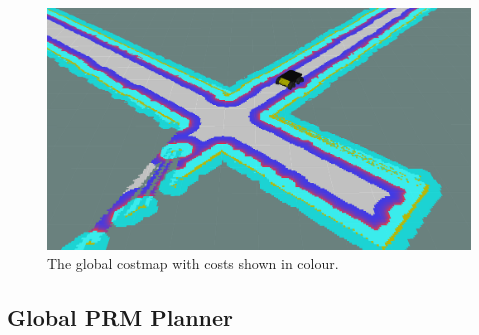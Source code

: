 \documentclass[letterpaper, 10 pt, conference]{ieeeconf}  %
\begin{document}
	\begin{figure}[!ht]
		\centering
		\includegraphics[width=1.0\columnwidth]{Figures/global_costmap}
		\caption{The global costmap with costs shown in colour.}
		\label{global_costmap}
	\end{figure}

\subsection{Global PRM Planner}
\end{document}
